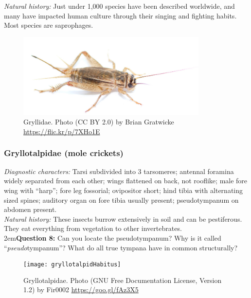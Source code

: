 \documentclass[letterpaper, 11pt]{article}
\begin{document}
\noindent{}\textit{Natural history:} Just under 1,000 species have been described worldwide, and many have impacted human culture through their singing and fighting habits. Most species are saprophages.\\

\begin{figure}[ht!]
  \centering
    \includegraphics[width=0.85\textwidth]{gryll}
  \caption{Gryllidae. Photo (CC BY 2.0) by Brian Gratwicke \url{https://flic.kr/p/7XHo1E}}
  \label{fig:gryllid}
\end{figure}

\subsubsection{Gryllotalpidae (mole crickets)}
\noindent{}\textit{Diagnostic characters:} Tarsi subdivided into 3 tarsomeres; antennal foramina widely separated from each other; wings flattened on back, not rooflike; male fore wing with ``harp''; fore leg fossorial; ovipositor short; hind tibia with alternating sized spines; auditory organ on fore tibia usually present; pseudotympanum on abdomen present.\\

\noindent{}\textit{Natural history:} These insects burrow extensively in soil and can be pestiferous. They eat everything from vegetation to other invertebrates.\\

\hangindent2em\textbf{Question 8:} Can you locate the pseudotympanum? Why is it called ``\textit{pseudo}tympanum''? What do all true tympana have in common structurally?\\

\begin{figure}[ht!]
  \centering
    \texttt{[image: gryllotalpidHabitus]}
  \caption{Gryllotalpidae. Photo (GNU Free Documentation License, Version 1.2) by Fir0002 \url{https://goo.gl/fAz3X5}}
  \label{fig:gryllotalp}
\end{figure}
\end{document}
